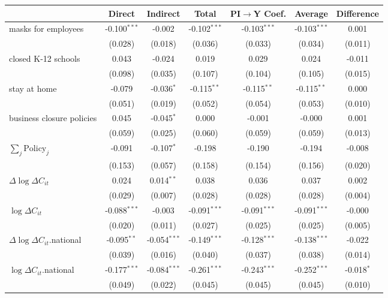 
\begin{tabular}{lccccc|>{}c}
\toprule
  & Direct & Indirect & Total & PI$\to$Y Coef. & Average & Difference\\
\midrule
masks for employees & -0.100$^{***}$ & -0.002 & -0.102$^{***}$ & -0.103$^{***}$ & -0.103$^{***}$ & 0.001\\
 & (0.028) & (0.018) & (0.036) & (0.033) & (0.034) & (0.011)\\
closed K-12 schools & 0.043 & -0.024 & 0.019 & 0.029 & 0.024 & -0.011\\
 & (0.098) & (0.035) & (0.107) & (0.104) & (0.105) & (0.015)\\
stay at home & -0.079 & -0.036$^{*}$ & -0.115$^{**}$ & -0.115$^{**}$ & -0.115$^{**}$ & 0.000\\
 & (0.051) & (0.019) & (0.052) & (0.054) & (0.053) & (0.010)\\
business closure policies & 0.045 & -0.045$^{*}$ & 0.000 & -0.001 & -0.000 & 0.001\\
 & (0.059) & (0.025) & (0.060) & (0.059) & (0.059) & (0.013)\\
$\sum_j \mathrm{Policy}_j$ & -0.091 & -0.107$^{*}$ & -0.198 & -0.190 & -0.194 & -0.008\\
 & (0.153) & (0.057) & (0.158) & (0.154) & (0.156) & (0.020)\\
$\Delta \log \Delta C_{it}$ & 0.024 & 0.014$^{**}$ & 0.038 & 0.036 & 0.037 & 0.002\\
 & (0.029) & (0.007) & (0.028) & (0.028) & (0.028) & (0.004)\\
$\log \Delta C_{it}$ & -0.088$^{***}$ & -0.003 & -0.091$^{***}$ & -0.091$^{***}$ & -0.091$^{***}$ & -0.000\\
 & (0.020) & (0.011) & (0.027) & (0.025) & (0.025) & (0.005)\\
$\Delta \log \Delta C_{it}$.national & -0.095$^{**}$ & -0.054$^{***}$ & -0.149$^{***}$ & -0.128$^{***}$ & -0.138$^{***}$ & -0.022\\
 & (0.039) & (0.016) & (0.040) & (0.037) & (0.038) & (0.014)\\
$\log \Delta C_{it}$.national & -0.177$^{***}$ & -0.084$^{***}$ & -0.261$^{***}$ & -0.243$^{***}$ & -0.252$^{***}$ & -0.018$^{*}$\\
 & (0.049) & (0.022) & (0.045) & (0.045) & (0.045) & (0.010)\\
\bottomrule
\end{tabular}